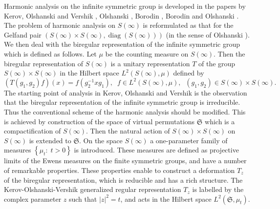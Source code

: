 \documentclass[12pt]{amsart}
\theoremstyle{definition}
\numberwithin{equation}{section}
\DeclareMathOperator{\diag}{diag}
\begin{document}
Harmonic analysis on the infinite symmetric group is developed in the papers by
Kerov, Olshanski and Vershik \cite{KerovOlshanskiVershik, KerovOlshanskiVershikAnnouncement},
Olshanski \cite{OlshanskiPointProcesses}, Borodin \cite{Borodin1, Borodin2}, Borodin and Olshanski
\cite{BorodinOlshanskiLetters}. The problem of harmonic analysis on
$S(\infty)$ is reformulated as that for the Gelfand pair $\left(S(\infty)\times S(\infty),\diag\left(S(\infty)\right)\right)$ (in the sense of Olshanski \cite{Olshanski}).
We then  deal with the biregular representation of the infinite symmetric group
which is defined as follows. Let $\mu$ be the counting measure on $S(\infty)$. Then the biregular representation of $S(\infty)$ is
a unitary representation  $T$ of the group $S(\infty)\times S(\infty)$ in the Hilbert space
$L^2(S(\infty),\mu)$  defined by
$$
\left(T(g_1,g_2)f\right)(x)=f(g_2^{-1}xg_1),\;\; f\in L^2(S(\infty),\mu),\;\; (g_1,g_2)\in S(\infty)\times S(\infty).
$$
The starting point of analysis in Kerov, Olshanski and Vershik \cite{KerovOlshanskiVershik, KerovOlshanskiVershikAnnouncement} is the observation that the biregular representation of the infinite symmetric group is irreducible. Thus
the conventional scheme of the harmonic analysis should be modified.
This is achieved by construction of the space of virtual permutations $\mathfrak{S}$ which is a compactification of $S(\infty)$. Then the natural action of $S(\infty)\times S(\infty)$ on $S(\infty)$ is extended to $\mathfrak{S}$. On the space $S(\infty)$ a one-parameter family of measures
$\left\{\mu_t:\; t>0\right\}$ is introduced. These measures are defined as projective limits  of
the Ewens measures on the finite symmetric groups, and have a number of remarkable  properties. These properties enable to construct a deformation $T_{z}$ of the biregular representation, which is reducible and has a rich structure. The Kerov-Olshanski-Vershik generalized regular representation $T_{z}$
is labelled by the complex parameter $z$ such that $|z|^2=t$, and acts in the Hilbert space
$L^2\left(\mathfrak{S},\mu_t\right)$.
\end{document}
